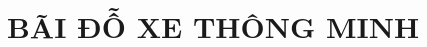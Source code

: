 \documentclass[final]{mobilereport}
\title{BÃI ĐỖ XE THÔNG MINH }
\begin{document}
\coverpage%

\frontmatter
\tableofcontents
\clearpage

\mainthesis









\end{document}
